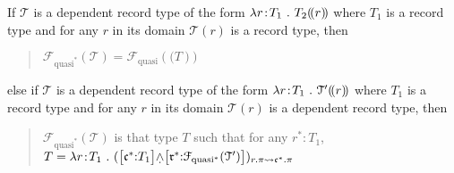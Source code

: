 
If $\mathcal{T}$ is a dependent record type of the form $\lambda
r\!:\!T_1\ .\ T_2(\!(r)\!)$ where $T_1$ is a record type and for any $r$
in its domain $\mathcal{T}(r)$ is a record type, then
\begin{quote}
  $\mathcal{F}_{\text{quasi}^*}(\mathcal{T}) =
  \mathcal{F}_{\text{quasi}}(\mathcal(T))$
\end{quote}
else if $\mathcal{T}$ is a dependent record type of the form $\lambda
r\!:\!T_1\ .\ \mathcal{T}'(\!(r)\!)$  where  $T_1$ is a record type and
for any $r$ in its domain $\mathcal{T}(r)$ is a dependent record type,
then
\begin{quote}
  $\mathcal{F}_{\text{quasi}^*}(\mathcal{T})$ is that type $T$ such
  that for any $r^*:T_1$, $T = \lambda r\!:\!T_1\ .\
  (\text{\smallrecord{
      \smalltfield{$\mathfrak{c}^*$}{$T_1$}}\d{$\wedge$}\smallrecord{
      \smalltfield{$\mathfrak{r}^*$}{$\mathcal{F}_{\text{quasi}^*}(\mathcal{T}')$}}})_{r.\pi\leadsto\mathfrak{c}^*.\pi}$
\end{quote}


